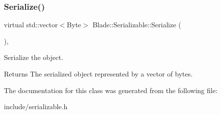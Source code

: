 \subsubsection{\texorpdfstring{Serialize()}{Serialize()}}
{\footnotesize\ttfamily virtual std\+::vector$<$Byte$>$ Blade\+::\+Serializable\+::\+Serialize (\begin{DoxyParamCaption}{ }\end{DoxyParamCaption})\hspace{0.3cm}{\ttfamily [pure virtual]}, {\ttfamily [noexcept]}}



Serialize the object. 

\begin{DoxyReturn}{Returns}
The serialized object represented by a vector of bytes. 
\end{DoxyReturn}


The documentation for this class was generated from the following file\+:\begin{DoxyCompactItemize}
\item 
include/serializable.\+h\end{DoxyCompactItemize}
